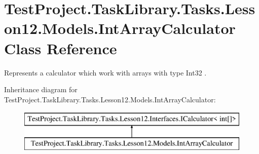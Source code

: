 \hypertarget{class_test_project_1_1_task_library_1_1_tasks_1_1_lesson12_1_1_models_1_1_int_array_calculator}{}\section{Test\+Project.\+Task\+Library.\+Tasks.\+Lesson12.\+Models.\+Int\+Array\+Calculator Class Reference}
\label{class_test_project_1_1_task_library_1_1_tasks_1_1_lesson12_1_1_models_1_1_int_array_calculator}


Represents a calculator which work with arrays with type Int32 .  


Inheritance diagram for Test\+Project.\+Task\+Library.\+Tasks.\+Lesson12.\+Models.\+Int\+Array\+Calculator\+:\begin{figure}[H]
\begin{center}
\leavevmode
\includegraphics[height=2.000000cm]{class_test_project_1_1_task_library_1_1_tasks_1_1_lesson12_1_1_models_1_1_int_array_calculator}
\end{center}
\end{figure}
